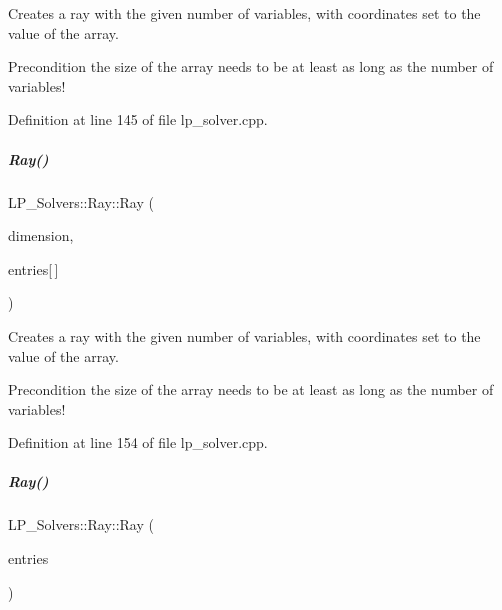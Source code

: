 Creates a ray with the given number of variables, with coordinates set to the value of the array. 

\begin{DoxyPrecond}{Precondition}
the size of the array needs to be at least as long as the number of variables! 
\end{DoxyPrecond}


Definition at line 145 of file lp\+\_\+solver.\+cpp.

\mbox{\label{group___c_l_s_solvers_aecc046b9f6a47f40ffddfc3334a47079}} 
\subparagraph{\texorpdfstring{Ray()}{Ray()}\hspace{0.1cm}{\footnotesize\ttfamily [3/5]}}
{\footnotesize\ttfamily L\+P\+\_\+\+Solvers\+::\+Ray\+::\+Ray (\begin{DoxyParamCaption}\item[{N\+V\+A\+R\+\_\+\+T\+Y\+PE}]{dimension,  }\item[{const E\+X\+P\+\_\+\+T\+Y\+PE}]{entries\mbox{[}$\,$\mbox{]} }\end{DoxyParamCaption})}



Creates a ray with the given number of variables, with coordinates set to the value of the array. 

\begin{DoxyPrecond}{Precondition}
the size of the array needs to be at least as long as the number of variables! 
\end{DoxyPrecond}


Definition at line 154 of file lp\+\_\+solver.\+cpp.

\mbox{\label{group___c_l_s_solvers_adb1e6f09dbb5081c8f34d245b1880ccc}} 
\subparagraph{\texorpdfstring{Ray()}{Ray()}\hspace{0.1cm}{\footnotesize\ttfamily [4/5]}}
{\footnotesize\ttfamily L\+P\+\_\+\+Solvers\+::\+Ray\+::\+Ray (\begin{DoxyParamCaption}\item[{const vector$<$ R\+A\+Y\+E\+N\+T\+\_\+\+T\+Y\+PE $>$ \&}]{entries }\end{DoxyParamCaption})}



